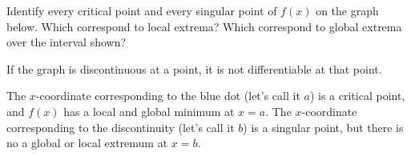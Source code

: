 \begin{Mquestion}
Identify every critical point and every singular point of $f(x)$
on the graph below. Which correspond to local extrema? Which correspond to global extrema over the interval shown?

\begin{center}\end{center}

\end{Mquestion}
\begin{hint}
If the graph is discontinuous at a point, it is not differentiable at that point.
\end{hint}
\begin{answer}
\begin{center}\end{center}
The $x$-coordinate corresponding to the blue dot (let's call it $a$) is a critical point, and $f(x)$ has a local and global minimum at $x=a$. The $x$-coordinate corresponding to the discontinuity (let's call it $b$) is a singular point, but there is no a global or local extremum at $x=b$.
\end{answer}
